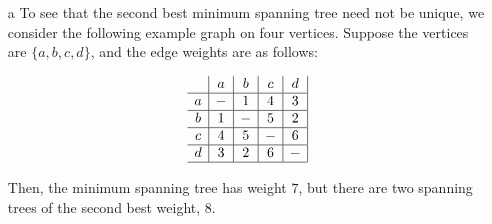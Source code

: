 \documentclass{article}
\begin{document}
\begin{enumerate}
  \item[a] To see that the second best minimum spanning tree need not be unique, we consider the following example graph on four vertices. Suppose the vertices are $\{a, b, c, d\}$, and the edge weights are as follows:
  
  $$
  \begin{array}{c|c|c|c|c|}
    & a & b & c & d \\
  \hline
  a & - & 1 & 4 & 3 \\
  \hline
  b & 1 & - & 5 & 2 \\
  \hline
  c & 4 & 5 & - & 6 \\
  \hline
  d & 3 & 2 & 6 & - \\
  \hline
  \end{array}
  $$
  
  Then, the minimum spanning tree has weight $7$, but there are two spanning trees of the second best weight, $8$.


\end{enumerate}
\end{document}
